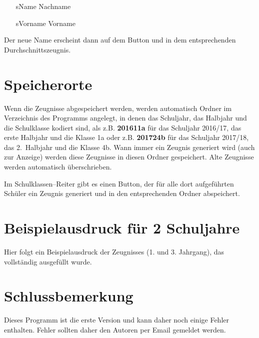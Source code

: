 \documentclass[a4paper,notitlepage,parskip]{scrartcl}
\newcommand\ott{\normalfont\ttfamily}
\begin{document}
\begin{itemize}
\setlength{\itemindent}{3.5cm}
\item[sName] Nachname
\item[sVorname] Vorname
\end{itemize}

Der neue Name erscheint dann auf dem Button und in dem entsprechenden Durchschnittszeugnis.
\section{Speicherorte}
Wenn die Zeugnisse abgespeichert werden, werden automatisch Ordner im Verzeichnis des Programms angelegt, in denen das Schuljahr, das Halbjahr und die Schulklasse kodiert sind, als z.B.
{\ott\normalfont\bfseries 201611a} für das Schuljahr 2016/17, das erste Halbjahr und die Klasse 1a oder z.B. {\ott\normalfont\bfseries 201724b}
für das Schuljahr 2017/18, das 2.~Halbjahr und die Klasse 4b.
Wann immer ein Zeugnis generiert wird (auch zur Anzeige) werden diese Zeugnisse in diesen Ordner gespeichert. Alte Zeugnisse werden automatisch überschrieben.

Im Schulklassen--Reiter gibt es einen Button, der für alle dort aufgeführten Schüler ein Zeugnis generiert und in den entsprechenden Ordner abspeichert.

\section{Beispielausdruck für 2 Schuljahre}
Hier folgt ein Beispielausdruck der Zeugnisses (1. und 3. Jahrgang), das vollständig ausgefüllt wurde.



%
%


\section{Schlussbemerkung}
Dieses Programm ist die erste Version und kann daher noch einige Fehler enthalten.
Fehler sollten daher den Autoren per Email gemeldet werden.
\end{document}
